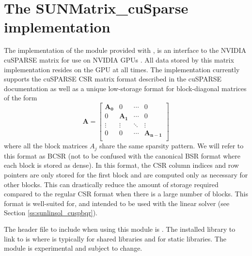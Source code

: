 \section{The SUNMatrix\_cuSparse implementation}\label{ss:sunmat_cusparse}

The  implementation of the  module provided with
{\sundials}, is an interface to the NVIDIA cuSPARSE matrix for use on NVIDIA GPUs
\cite{cuSPARSE_site}. All data stored by this matrix implementation resides on the
GPU at all times. The implementation currently supports the cuSPARSE CSR matrix
format described in the cuSPARSE documentation as well as a unique low-storage
format for block-diagonal matrices of the form
\begin{equation*}
  \mathbf{A} =
  \begin{bmatrix}
    \mathbf{A_0} & 0 & \cdots & 0\\
    0 & \mathbf{A_1} & \cdots & 0\\
    \vdots & \vdots & \ddots & \vdots\\
    0 & 0 & \cdots & \mathbf{A_{n-1}}\\
  \end{bmatrix}
\end{equation*}
where all the block matrices $A_j$ share the same sparsity pattern.
We will refer to this format as BCSR (not to be confused with the canonical BSR format where
each block is stored as dense). In this format, the CSR column indices and row pointers
are only stored for the first block and are computed only as necessary for other blocks.
This can drastically reduce the amount of storage required compared to the regular CSR
format when there is a large number of blocks. This format is well-suited for, and
intended to be used with the  linear
solver (see Section \ref{ss:sunlinsol_cuspbqr}).

The header file to include when using this module is
. The installed library to link to is
 where  is typically 
for shared libraries and  for static libraries.
\newline
\newline
{\warn}The  module is experimental and subject to change.

